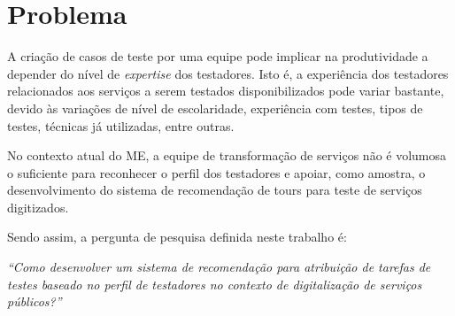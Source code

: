 \section{Problema}

A criação de casos de teste por uma equipe pode implicar na produtividade a depender do nível de \textit{expertise} dos testadores. Isto é, a experiência dos testadores relacionados aos serviços a serem testados disponibilizados pode variar bastante, devido às variações de nível de escolaridade, experiência com testes, tipos de testes, técnicas já utilizadas, entre outras. 

No contexto atual do ME, a equipe de transformação de serviços não é volumosa o suficiente para reconhecer o perfil dos testadores e apoiar, como amostra, o desenvolvimento do sistema de recomendação de tours para teste de serviços digitizados. 

Sendo assim, a pergunta de pesquisa definida neste trabalho é:


\textit{``Como desenvolver um sistema de recomendação para atribuição de tarefas de testes baseado no perfil de testadores no contexto de digitalização de serviços públicos?''}
